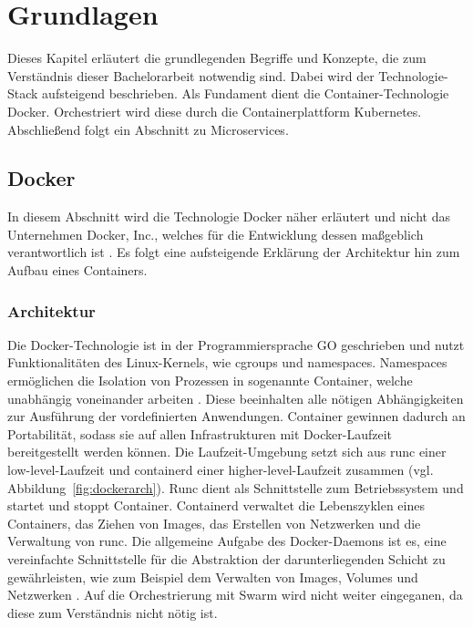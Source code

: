 \chapter{Grundlagen}
Dieses Kapitel erläutert die grundlegenden Begriffe und Konzepte, die zum 
Verständnis dieser Bachelorarbeit notwendig sind. 
Dabei wird der Technologie-Stack aufsteigend beschrieben.
Als Fundament dient die Container-Technologie Docker.
Orchestriert wird diese durch die Containerplattform Kubernetes.
Abschließend folgt ein Abschnitt zu Microservices.


\section{Docker} \label{Docker}

In diesem Abschnitt wird die Technologie Docker näher erläutert und
nicht das Unternehmen Docker, Inc., welches für die Entwicklung dessen maßgeblich verantwortlich ist \cite[S.11]{dockerdeep}.
Es folgt eine aufsteigende Erklärung der Architektur hin zum Aufbau eines Containers.


\subsection{Architektur}
Die Docker-Technologie ist in der Programmiersprache GO geschrieben und nutzt Funktionalitäten des
Linux-Kernels, wie cgroups und namespaces.
Namespaces ermöglichen die Isolation von Prozessen in sogenannte Container, welche unabhängig voneinander arbeiten \cite{dockergetstarted}.
Diese beeinhalten alle nötigen Abhängigkeiten zur Ausführung der vordefinierten Anwendungen.
Container gewinnen dadurch an Portabilität,
sodass sie auf allen Infrastrukturen mit Docker-Laufzeit bereitgestellt werden können.
Die Laufzeit-Umgebung setzt sich aus \glqq runc\grqq{} einer low-level-Laufzeit und \glqq containerd\grqq{} einer higher-level-Laufzeit zusammen (vgl. Abbildung~\ref{fig:dockerarch}).
Runc dient als Schnittstelle zum Betriebssystem und startet und stoppt Container.
Containerd verwaltet die Lebenszyklen eines Containers, das Ziehen von Images, das Erstellen von Netzwerken und die Verwaltung von runc.
Die allgemeine Aufgabe des Docker-Daemons ist es, eine vereinfachte Schnittstelle für die Abstraktion
der darunterliegenden Schicht zu gewährleisten, wie zum Beispiel dem Verwalten von Images, Volumes und Netzwerken \cite[S.12]{dockerdeep}.
Auf die Orchestrierung mit Swarm wird nicht weiter eingeganen, da diese zum Verständnis nicht nötig ist.

